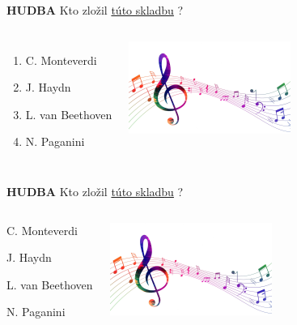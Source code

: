 \documentclass[dvipsnames]{beamer}
\begin{document}
\begin{frame}
	\textbf{HUDBA}
	\vskip 3mm
	Kto zložil \href{https://www.gtsforum.xyz/kviz1.mp3}{túto skladbu} ?
	\begin{columns}
	\begin{enumerate}
		\item C. Monteverdi
		\item J. Haydn
		\item L. van Beethoven
		\item N. Paganini
	\end{enumerate}
		\includegraphics[scale=0.5]{music}
	\end{columns}
\end{frame}
\begin{frame}
	\textbf{HUDBA}
	\vskip 3mm
	Kto zložil \href{https://www.gtsforum.xyz/kviz1.mp3}{túto skladbu} ?
	\begin{columns}
	\column{0.5\textwidth}
	\begin{enumerate}
		\item C. Monteverdi
		\textcolor{g}{\item[\textcolor{g}{2.}] J. Haydn}\setcounter{enumi}{2}
		\item L. van Beethoven
		\item  N. Paganini
	\end{enumerate}
	\column{0.5\textwidth}
		\includegraphics[scale=0.5]{music}

	\end{columns}
\end{frame}
\end{document}
